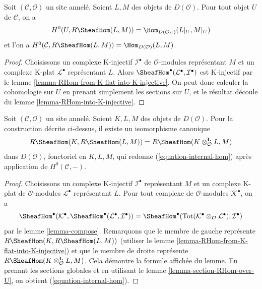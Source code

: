 \begin{lemma}
\label{lemma-section-RHom-over-U}
Soit $(\mathcal{C}, \mathcal{O})$ un site annelé. Soient $L, M$ des objets
de $D(\mathcal{O})$. Pour tout objet $U$ de $\mathcal{C}$, on a
$$
H^0(U, R\SheafHom(L, M)) =
\Hom_{D(\mathcal{O}_U)}(L|_U, M|_U)
$$
et l'on a $H^0(\mathcal{C}, R\SheafHom(L, M)) =
\Hom_{D(\mathcal{O})}(L, M)$.
\end{lemma}

\begin{proof}
Choisissons un complexe K-injectif $\mathcal{I}^\bullet$ de
$\mathcal{O}$-modules représentant $M$ et un complexe K-plat
$\mathcal{L}^\bullet$ représentant $L$. Alors
$\SheafHom^\bullet(\mathcal{L}^\bullet, \mathcal{I}^\bullet)$
est K-injectif par le lemme \ref{lemma-RHom-from-K-flat-into-K-injective}.
On peut donc calculer la cohomologie sur $U$ en prenant simplement les sections sur $U$,
et le résultat découle du lemme \ref{lemma-RHom-into-K-injective}.
\end{proof}

\begin{lemma}
\label{lemma-internal-hom}
Soit $(\mathcal{C}, \mathcal{O})$ un site annelé. Soient $K, L, M$ des objets
de $D(\mathcal{O})$. Pour la construction décrite ci-dessus,
il existe un isomorphisme canonique
$$
R\SheafHom(K, R\SheafHom(L, M)) =
R\SheafHom(K \otimes_\mathcal{O}^\mathbf{L} L, M)
$$
dans $D(\mathcal{O})$, fonctoriel en $K, L, M$,
qui redonne (\ref{equation-internal-hom}) après application de $H^0(\mathcal{C}, -)$.
\end{lemma}

\begin{proof}
Choisissons un complexe K-injectif $\mathcal{I}^\bullet$ représentant
$M$ et un complexe K-plat de $\mathcal{O}$-modules $\mathcal{L}^\bullet$
représentant $L$.
Pour tout complexe de $\mathcal{O}$-modules $\mathcal{K}^\bullet$,
on a
$$
\SheafHom^\bullet(\mathcal{K}^\bullet,
\SheafHom^\bullet(\mathcal{L}^\bullet, \mathcal{I}^\bullet))
=
\SheafHom^\bullet(
\text{Tot}(\mathcal{K}^\bullet \otimes_\mathcal{O} \mathcal{L}^\bullet),
\mathcal{I}^\bullet)
$$
par le lemme \ref{lemma-compose}.
Remarquons que le membre de gauche représente
$R\SheafHom(K, R\SheafHom(L, M))$ (utiliser le
lemme \ref{lemma-RHom-from-K-flat-into-K-injective})
et que le membre de droite représente
$R\SheafHom(K \otimes_\mathcal{O}^\mathbf{L} L, M)$.
Cela démontre la formule affichée du lemme.
En prenant les sections globales et en utilisant le lemme \ref{lemma-section-RHom-over-U},
on obtient (\ref{equation-internal-hom}).
\end{proof}

